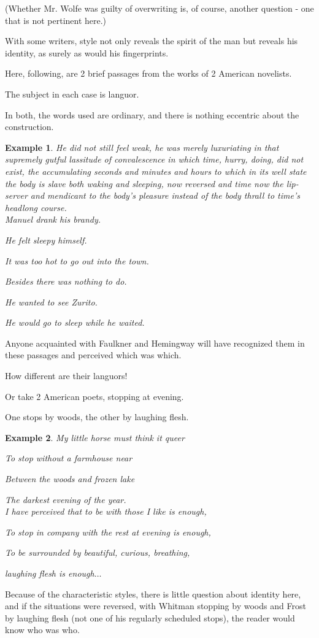 \documentclass{book}
\numberwithin{equation}{section}
\newtheorem{example}{Example}[chapter]
\begin{document}
(Whether Mr. Wolfe was guilty of overwriting is, of course, another question - one that is not pertinent here.)

%
With some writers, style not only reveals the spirit of the man but reveals his identity, as surely as would his fingerprints.

Here, following, are 2 brief passages from the works of 2 American novelists.

The subject in each case is languor.

In both, the words used are ordinary, and there is nothing eccentric about the construction.
\begin{example}
    He did not still feel weak, he was merely luxuriating in that supremely gutful lassitude of convalescence in which time, hurry, doing, did not exist, the accumulating seconds and minutes and hours to which in its well state the body is slave both waking and sleeping, now reversed and time now the lip-server and mendicant to the body's pleasure instead of the body thrall to time's headlong course.
    \\
    
    Manuel drank his brandy.
    
    He felt sleepy himself.
    
    It was too hot to go out into the town.
    
    Besides there was nothing to do.
    
    He wanted to see Zurito.
    
    He would go to sleep while he waited.
\end{example}
Anyone acquainted with Faulkner and Hemingway will have recognized them in these passages and perceived which was which.

How different are their languors!

%
Or take 2 American poets, stopping at evening.

One stops by woods, the other by laughing flesh.
\begin{example}
    My little horse must think it queer
    
    To stop without a farmhouse near
    
    Between the woods and frozen lake
    
    The darkest evening of the year.
    \\
    
    I have perceived that to be with those I like is enough,
    
    To stop in company with the rest at evening is enough,
    
    To be surrounded by beautiful, curious, breathing,
    
    laughing flesh is enough$\ldots$
\end{example}
Because of the characteristic styles, there is little question about identity here, and if the situations were reversed, with Whitman stopping by woods and Frost by laughing flesh (not one of his regularly scheduled stops), the reader would know who was who.
\end{document}

